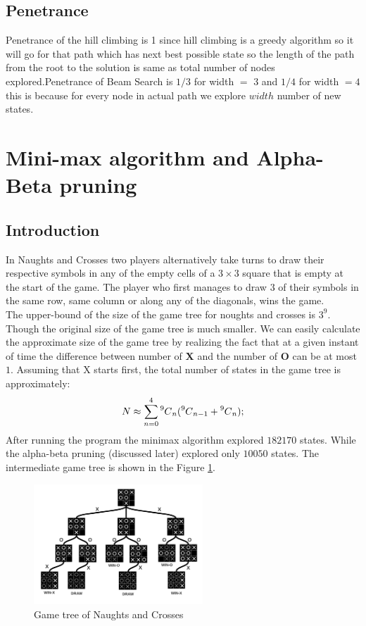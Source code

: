 \documentclass[journal, compsoc]{IEEEtran}
\newcommand\Mycomb[2][^n]{\prescript{#1\mkern-0.5mu}{}C_{#2}}
\begin{document}
\subsection{Penetrance}
Penetrance of the hill climbing is 1 since hill climbing is a greedy algorithm so it will go for that path which has next best possible state
so the length of the path from the root to the solution is same as total number of nodes explored.Penetrance of Beam Search is $1/3$ for width
$=$ 3 and $1/4$ for width $=4$ this is because for every node in actual path we explore $width$ number of new states.

\section{Mini-max algorithm and Alpha-Beta pruning}
\subsection{Introduction}
In Naughts and Crosses two players alternatively take turns to draw their respective symbols in any of the empty cells of a $3 \times 3$ square that is empty
at the start of the game. The player who first manages to draw $3$ of their symbols in the same row, same column or along any of the diagonals, wins the game.\\
The upper-bound of the size of the game tree for noughts and crosses is $3^9$. Though the original size of the game tree is much smaller. We can easily calculate
the approximate size of the game tree by realizing the fact that at a given instant of time the difference between number of \textbf{X} and the number of \textbf{O}
can be at most $1$. Assuming that X starts first, the total number of states in the game tree is approximately:
\[
  N \approx \sum_{n = 0}^{4}\Mycomb[9]{n}(\Mycomb[9]{n - 1} + \Mycomb[9]{n});
\]
After running the program the minimax algorithm explored \textbf{$182170$} states. While the alpha-beta pruning (discussed later) explored only \textbf{$10050$} states.
The intermediate game tree is shown in the Figure \ref{fig_te}.

\begin{figure}[!h]
\centering
\includegraphics[width=2.5in]{graph.pdf}
\caption{Game tree of Naughts and Crosses}
\label{fig_te}
\end{figure}
\end{document}
